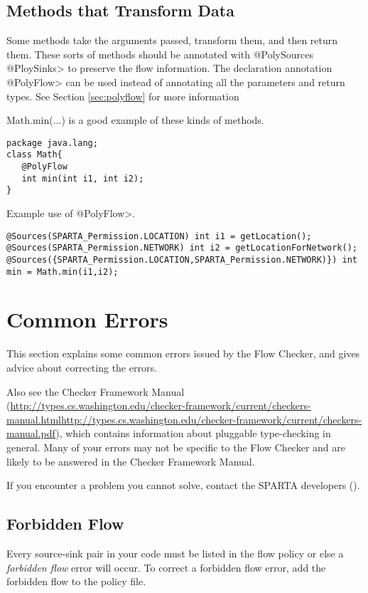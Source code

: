 \subsection{Methods that Transform Data}

Some methods take the arguments passed, transform them, and then return them.  These sorts of 
methods should be annotated with \<@PolySources @PloySinks>
  to preserve the flow information.  The declaration annotation \<@PolyFlow> can be used instead of
  annotating all the parameters and return types. See Section \ref{sec:polyflow} for more information 
  
  Math.min(...) is a good example of these kinds of methods. 
  
  \begin{Verbatim}
package java.lang;
class Math{
   @PolyFlow  
   int min(int i1, int i2);
}
\end{Verbatim}

Example use of \<@PolyFlow>.
\begin{Verbatim}
@Sources(SPARTA_Permission.LOCATION) int i1 = getLocation();
@Sources(SPARTA_Permission.NETWORK) int i2 = getLocationForNetwork();
@Sources({SPARTA_Permission.LOCATION,SPARTA_Permission.NETWORK)}) int min = Math.min(i1,i2);
 \end{Verbatim}

\section{Common Errors\label{errors}}

This section explains some common errors issued by the Flow Checker, and
gives advice about correcting the errors.   

Also see the Checker Framework Manual
(\ifhevea\url{http://types.cs.washington.edu/checker-framework/current/checkers-manual.html}\else\url{http://types.cs.washington.edu/checker-framework/current/checkers-manual.pdf}\fi),
which contains information about pluggable type-checking in general.  Many
of your errors may not be specific to the Flow Checker and are likely to be
answered in the Checker Framework Manual.

If you encounter a problem you cannot solve, contact the SPARTA developers ().



\subsection{Forbidden Flow}  
Every source-sink pair in your code must be listed in the flow policy or else a \emph{forbidden flow} error will occur.
To correct a forbidden flow error, add the forbidden flow to the policy file. 
  
